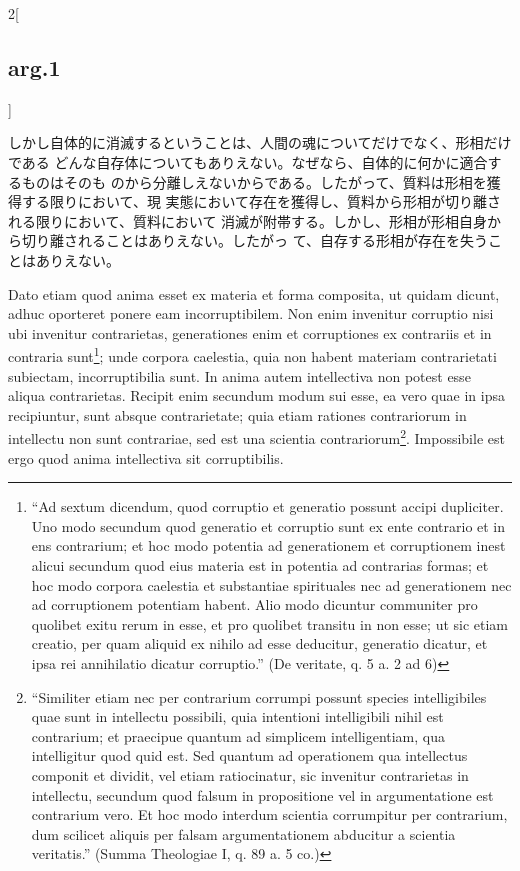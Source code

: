 \documentclass[paper=a4paper,fontsize=10pt,jafontsize=9pt,titlepage]{jlreq}
\begin{document}
\begin{paracol}{2}[\subsection{arg.1}]
\switchcolumn

 しかし自体的に消滅するということは、人間の魂についてだけでなく、形相だけである
 どんな自存体についてもありえない。なぜなら、自体的に何かに適合するものはそのも
 のから分離しえないからである。したがって、質料は形相を獲得する限りにおいて、現
 実態において存在を獲得し、質料から形相が切り離される限りにおいて、質料において
 消滅が附帯する。しかし、形相が形相自身から切り離されることはありえない。したがっ
 て、自存する形相が存在を失うことはありえない。

\switchcolumn*

Dato etiam quod anima esset ex materia et forma composita, ut quidam dicunt,
adhuc oporteret ponere eam incorruptibilem. Non enim invenitur corruptio nisi
ubi invenitur contrarietas, generationes enim et corruptiones ex contrariis et
in contraria sunt\footnote{ ``Ad sextum dicendum, quod corruptio et generatio
possunt accipi dupliciter. Uno modo secundum quod generatio et corruptio sunt ex
ente contrario et in ens contrarium; et hoc modo potentia ad generationem et
corruptionem inest alicui secundum quod eius materia est in potentia ad
contrarias formas; et hoc modo corpora caelestia et substantiae spirituales nec
ad generationem nec ad corruptionem potentiam habent. Alio modo dicuntur
communiter pro quolibet exitu rerum in esse, et pro quolibet transitu in non
esse; ut sic etiam creatio, per quam aliquid ex nihilo ad esse deducitur,
generatio dicatur, et ipsa rei annihilatio dicatur corruptio.''  (De veritate,
q. 5 a. 2 ad 6)}; unde corpora caelestia, quia non habent materiam contrarietati
subiectam, incorruptibilia sunt. In anima autem intellectiva non potest esse
aliqua contrarietas. Recipit enim secundum modum sui esse, ea vero quae in ipsa
recipiuntur, sunt absque contrarietate; quia etiam rationes contrariorum in
intellectu non sunt contrariae, sed est una scientia contrariorum\footnote{
``Similiter etiam nec per contrarium corrumpi possunt species intelligibiles
quae sunt in intellectu possibili, quia intentioni intelligibili nihil est
contrarium; et praecipue quantum ad simplicem intelligentiam, qua intelligitur
quod quid est. Sed quantum ad operationem qua intellectus componit et dividit,
vel etiam ratiocinatur, sic invenitur contrarietas in intellectu, secundum quod
falsum in propositione vel in argumentatione est contrarium vero. Et hoc modo
interdum scientia corrumpitur per contrarium, dum scilicet aliquis per falsam
argumentationem abducitur a scientia veritatis.'' (Summa Theologiae I, q. 89
a. 5 co.)}. Impossibile est ergo quod anima intellectiva sit corruptibilis.



\end{paracol}
\end{document}
